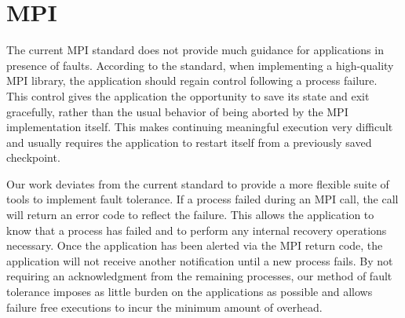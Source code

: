\section{MPI} \label{sect:mpi}


The current MPI standard does not provide much guidance for applications in
presence of faults. According to the standard, when implementing a high-quality
MPI library, the application should regain control following a process failure.
This control gives the application the opportunity to save its state and exit
gracefully, rather than the usual behavior of being aborted by the MPI
implementation itself. This makes continuing meaningful execution very difficult
and usually requires the application to restart itself from a previously saved checkpoint.




Our work deviates from the current standard to provide a more flexible suite
of tools to implement fault tolerance. 
%
If a process failed during an MPI call, the call will return an error code to
reflect the failure. This allows the application to know that a process has
failed and to perform any internal recovery operations necessary. Once the
application has been alerted via the MPI return code, the application will not
receive another notification until a new process fails. By not requiring an
acknowledgment from the remaining processes, our method of fault tolerance
imposes as little burden on the applications as possible and allows failure free
executions to incur the minimum amount of overhead.


